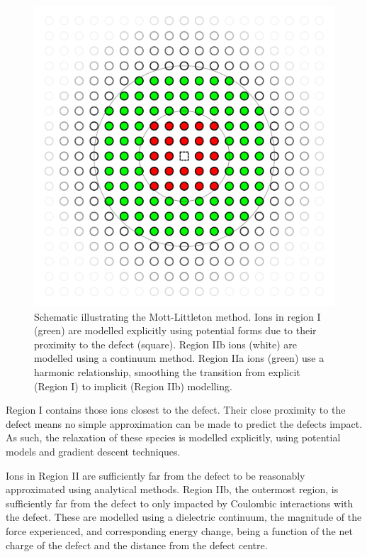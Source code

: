 \begin{figure}
  \centering
  \includegraphics[width = \linewidth]{figures/mott/mott}
  \caption[Mott-Littleton method schematic]{Schematic illustrating the Mott-Littleton method. Ions in region I (green) are modelled explicitly using potential forms due to their proximity to the defect (square). Region IIb ions (white) are modelled using a continuum method. Region IIa ions (green) use a harmonic relationship, smoothing the transition from explicit (Region I) to implicit (Region IIb) modelling.}
  \label{fig:mott}
\end{figure}

Region I contains those ions closest to the defect.
Their close proximity to the defect means no simple approximation can be made to predict the defects impact.
As such, the relaxation of these species is modelled explicitly, using potential models and gradient descent techniques.

Ions in Region II are sufficiently far from the defect to be reasonably approximated using analytical methods.
Region IIb, the outermost region, is sufficiently far from the defect to only impacted by Coulombic interactions with the defect.
These are modelled using a dielectric continuum, the magnitude of the force experienced, and corresponding energy change, being a function of the net charge of the defect and the distance from the defect centre.



